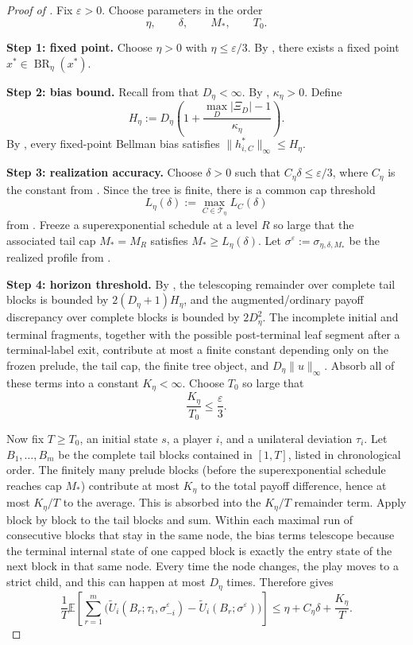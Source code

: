 \documentclass[12pt]{article}
\theoremstyle{definition}
\newcommand{\eps}{\varepsilon}
\newcommand{\E}{\mathbb{E}}
\newcommand{\1}{\mathbf{1}}
\newcommand{\cT}{\mathcal{T}}
\DeclareMathOperator{\BR}{BR}
\begin{document}
\begin{proof}[Proof of ]
Fix $\eps>0$. Choose parameters in the order
\[
\eta,\qquad \delta,\qquad M_*,\qquad T_0.
\]

\smallskip
\noindent\textbf{Step 1: fixed point.}
Choose $\eta>0$ with $\eta\le \eps/3$. By
, there exists a fixed point $x^*\in\BR_\eta(x^*)$.

\smallskip
\noindent\textbf{Step 2: bias bound.}
Recall from  that $D_\eta<\infty$. By
, $\kappa_\eta>0$. Define
\[
H_\eta:=D_\eta\left(1+\frac{\max_D|\Xi_D|-1}{\kappa_\eta}\right).
\]
By , every fixed-point Bellman bias satisfies
$\|h_{i,C}^*\|_\infty\le H_\eta$.

\smallskip
\noindent\textbf{Step 3: realization accuracy.}
Choose $\delta>0$ such that $C_\eta\delta\le \eps/3$, where $C_\eta$ is the
constant from . Since the tree is finite, there is a common
cap threshold
\[
L_\eta(\delta):=\max_{C\in\cT_\eta}L_C(\delta)
\]
from . Freeze a superexponential schedule at a level
$R$ so large that the associated tail cap $M_*=M_R$ satisfies
$M_*\ge L_\eta(\delta)$. Let
$\sigma^\eps:=\sigma_{\eta,\delta,M_*}$ be the realized profile from
.

\smallskip
\noindent\textbf{Step 4: horizon threshold.}
By , the telescoping remainder over complete tail blocks is
bounded by $2(D_\eta+1)H_\eta$, and the augmented/ordinary payoff discrepancy over
complete blocks is bounded by $2D_\eta^2$. The incomplete initial and terminal
fragments, together with the possible post-terminal leaf segment after a
terminal-label exit, contribute at most a finite constant depending only on the
frozen prelude, the tail cap, the finite tree object, and $D_\eta\|u\|_\infty$.
Absorb all of these terms into a constant $K_\eta<\infty$. Choose $T_0$ so large
that
\[
\frac{K_\eta}{T_0}\le \frac{\eps}{3}.
\]

Now fix $T\ge T_0$, an initial state $s$, a player $i$, and a unilateral deviation
$\tau_i$. Let $B_1,\dots,B_m$ be the complete tail blocks contained in $[1,T]$,
listed in chronological order. The finitely many prelude blocks (before the
superexponential schedule reaches cap $M_*$) contribute at most $K_\eta$ to the
total payoff difference, hence at most $K_\eta/T$ to the average. This is
absorbed into the $K_\eta/T$ remainder term. Apply  block
by block to the
tail blocks and sum. Within each maximal run of consecutive blocks that stay in
the same node, the bias terms telescope because the terminal internal state of one
capped block is exactly the entry state of the next block in that same node. Every
time the node changes, the play moves to a strict child, and this can happen at
most $D_\eta$ times. Therefore  gives
\[
\frac1T\E\left[\sum_{r=1}^m
\bigl(
\widetilde U_i(B_r;\tau_i,\sigma^\eps_{-i})
-
\widetilde U_i(B_r;\sigma^\eps)
\bigr)\right]
\le
\eta + C_\eta\delta + \frac{K_\eta}{T}.
\]


\end{proof}
\end{document}
